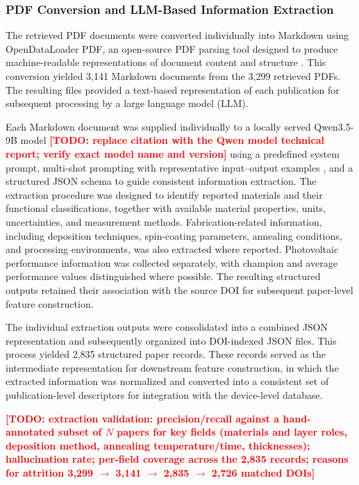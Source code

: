 \documentclass[3p]{elsarticle}
\newcommand{\authortodo}[1]{\textcolor{red}{\textbf{[TODO: #1]}}}
\begin{document}
\subsubsection{PDF Conversion and LLM-Based Information Extraction}

The retrieved PDF documents were converted individually into Markdown using OpenDataLoader PDF, an open-source PDF parsing tool designed to produce machine-readable representations of document content and structure \cite{opendataloaderpdf}. This conversion yielded 3,141 Markdown documents from the 3,299 retrieved PDFs. The resulting files provided a text-based representation of each publication for subsequent processing by a large language model (LLM).

Each Markdown document was supplied individually to a locally served Qwen3.5-9B model \authortodo{replace citation with the Qwen model technical report; verify exact model name and version} using a predefined system prompt, multi-shot prompting with representative input--output examples \cite{brown2020fewshot}, and a structured JSON schema to guide consistent information extraction. The extraction procedure was designed to identify reported materials and their functional classifications, together with available material properties, units, uncertainties, and measurement methods. Fabrication-related information, including deposition techniques, spin-coating parameters, annealing conditions, and processing environments, was also extracted where reported. Photovoltaic performance information was collected separately, with champion and average performance values distinguished where possible. The resulting structured outputs retained their association with the source DOI for subsequent paper-level feature construction.

The individual extraction outputs were consolidated into a combined JSON representation and subsequently organized into DOI-indexed JSON files. This process yielded 2,835 structured paper records. These records served as the intermediate representation for downstream feature construction, in which the extracted information was normalized and converted into a consistent set of publication-level descriptors for integration with the device-level database.

\authortodo{extraction validation: precision/recall against a hand-annotated subset of $N$ papers for key fields (materials and layer roles, deposition method, annealing temperature/time, thicknesses); hallucination rate; per-field coverage across the 2,835 records; reasons for attrition 3,299 $\rightarrow$ 3,141 $\rightarrow$ 2,835 $\rightarrow$ 2,726 matched DOIs}
\end{document}
